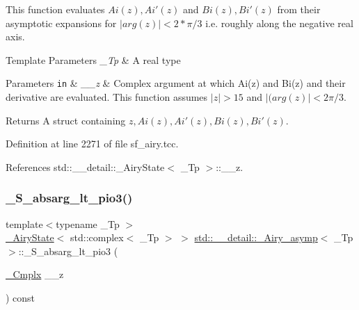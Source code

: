 This function evaluates $ Ai(z), Ai'(z) $ and $ Bi(z), Bi'(z) $ from their asymptotic expansions for $ |arg(z)| < 2*\pi/3 $ i.\+e. roughly along the negative real axis. 


\begin{DoxyTemplParams}{Template Parameters}
{\em \+\_\+\+Tp} & A real type \\
\hline
\end{DoxyTemplParams}

\begin{DoxyParams}[1]{Parameters}
\mbox{\tt in}  & {\em \+\_\+\+\_\+z} & Complex argument at which Ai(z) and Bi(z) and their derivative are evaluated. This function assumes $ |z| > 15 $ and $ |(arg(z)| < 2\pi/3 $. \\
\hline
\end{DoxyParams}
\begin{DoxyReturn}{Returns}
A struct containing $ z, Ai(z), Ai'(z), Bi(z), Bi'(z) $. 
\end{DoxyReturn}


Definition at line 2271 of file sf\+\_\+airy.\+tcc.



References std\+::\+\_\+\+\_\+detail\+::\+\_\+\+Airy\+State$<$ \+\_\+\+Tp $>$\+::\+\_\+\+\_\+z.

\mbox{\label{classstd_1_1____detail_1_1__Airy__asymp_a64bce3ed154b3268944ae20f324d64cd}} 
\subsubsection{\texorpdfstring{\+\_\+\+S\+\_\+absarg\+\_\+lt\+\_\+pio3()}{\_S\_absarg\_lt\_pio3()}}
{\footnotesize\ttfamily template$<$typename \+\_\+\+Tp $>$ \\
\hyperlink{structstd_1_1____detail_1_1__AiryState}{\+\_\+\+Airy\+State}$<$ std\+::complex$<$ \+\_\+\+Tp $>$ $>$ \hyperlink{classstd_1_1____detail_1_1__Airy__asymp}{std\+::\+\_\+\+\_\+detail\+::\+\_\+\+Airy\+\_\+asymp}$<$ \+\_\+\+Tp $>$\+::\+\_\+\+S\+\_\+absarg\+\_\+lt\+\_\+pio3 (\begin{DoxyParamCaption}\item[{\hyperlink{classstd_1_1____detail_1_1__Airy__asymp_ae28f102423d34e78502ab6da42d67f50}{\+\_\+\+Cmplx}}]{\+\_\+\+\_\+z }\end{DoxyParamCaption}) const}



